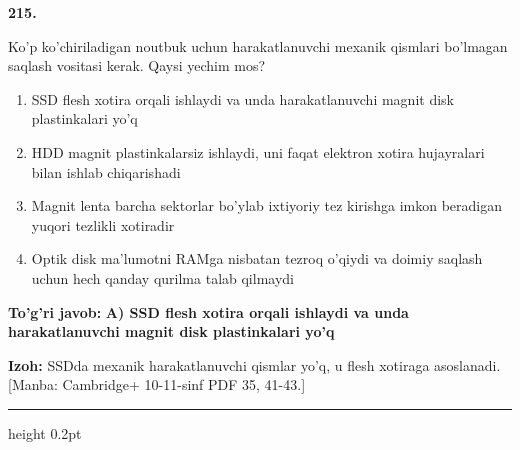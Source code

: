 \documentclass[10pt,a4paper]{article}
\begin{document}
{\bfseries\sffamily\color{ink} 215.}
\par
Ko'p ko'chiriladigan noutbuk uchun harakatlanuvchi mexanik qismlari bo'lmagan saqlash vositasi kerak. Qaysi yechim mos?
\begin{enumerate}[label=\Alph*),leftmargin=9mm]
\item SSD flesh xotira orqali ishlaydi va unda harakatlanuvchi magnit disk plastinkalari yo'q
\item HDD magnit plastinkalarsiz ishlaydi, uni faqat elektron xotira hujayralari bilan ishlab chiqarishadi
\item Magnit lenta barcha sektorlar bo'ylab ixtiyoriy tez kirishga imkon beradigan yuqori tezlikli xotiradir
\item Optik disk ma'lumotni RAMga nisbatan tezroq o'qiydi va doimiy saqlash uchun hech qanday qurilma talab qilmaydi
\end{enumerate}
\begin{tcolorbox}[enhanced,breakable,colback=teal!4,colframe=teal!60!black,boxrule=0.45pt,arc=1.2mm,left=2.7mm,right=2.7mm,top=1.8mm,bottom=1.8mm,before skip=2mm,after skip=2mm]
{\bfseries\sffamily\color{teal}To'g'ri javob:} \textbf{A) SSD flesh xotira orqali ishlaydi va unda harakatlanuvchi magnit disk plastinkalari yo'q}
\par\smallskip
{\bfseries Izoh:} SSDda mexanik harakatlanuvchi qismlar yo'q, u flesh xotiraga asoslanadi. [Manba: Cambridge+ 10-11-sinf PDF 35, 41-43.]
\end{tcolorbox}
\vspace{2mm}\hrule height 0.2pt\vspace{3mm}
\end{document}
